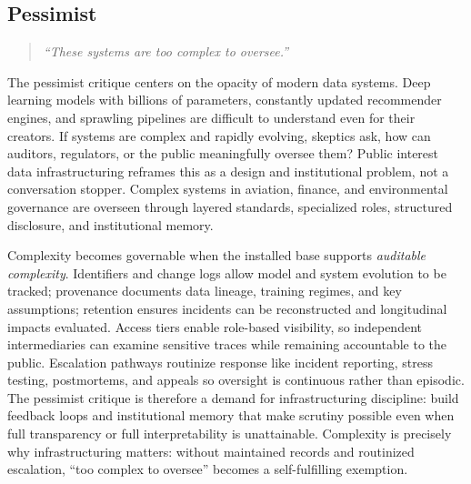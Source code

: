 \documentclass[acmsmall,screen]{acmart}
\begin{document}
\subsection*{Pessimist}
\begin{quote}\centering
\textit{``These systems are too complex to oversee.''}
\end{quote}

\noindent The pessimist critique centers on the opacity of modern data systems. Deep learning models with billions of parameters, constantly updated recommender engines, and sprawling pipelines are difficult to understand even for their creators. If systems are complex and rapidly evolving, skeptics ask, how can auditors, regulators, or the public meaningfully oversee them? Public interest data infrastructuring reframes this as a design and institutional problem, not a conversation stopper. Complex systems in aviation, finance, and environmental governance are overseen through layered standards, specialized roles, structured disclosure, and institutional memory.

Complexity becomes governable when the installed base supports \emph{auditable complexity}. Identifiers and change logs allow model and system evolution to be tracked; provenance documents data lineage, training regimes, and key assumptions; retention ensures incidents can be reconstructed and longitudinal impacts evaluated. Access tiers enable role-based visibility, so independent intermediaries can examine sensitive traces while remaining accountable to the public. Escalation pathways routinize response like incident reporting, stress testing, postmortems, and appeals so oversight is continuous rather than episodic. The pessimist critique is therefore a demand for infrastructuring discipline: build feedback loops and institutional memory that make scrutiny possible even when full transparency or full interpretability is unattainable. Complexity is precisely why infrastructuring matters: without maintained records and routinized escalation, ``too complex to oversee'' becomes a self-fulfilling exemption.

\end{document}
